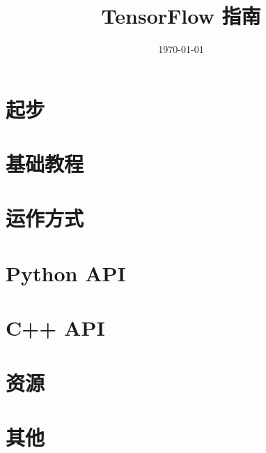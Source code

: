 \documentclass[a4paper,11pt,twoside]{ctexbook}
\title{TensorFlow 指南}
\author{}
\date{\today}
\begin{document}
\maketitle
\tableofcontents

\newpage
\chapter{起步}




\newpage
\chapter{基础教程}













\newpage
\chapter{运作方式}











\newpage
\chapter{Python API}















\newpage
\chapter{C++ API}

\newpage
\chapter{资源}

\newpage
\chapter{其他}
\end{document}
